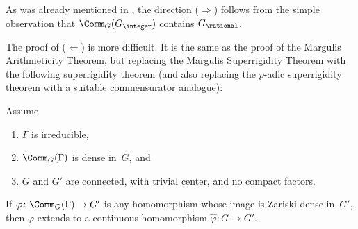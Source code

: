 As was already mentioned in , the direction ($\Rightarrow$) follows from the simple observation that $\Comm_G(G_\integer)$ contains $G_\rational$. 

The proof of ($\Leftarrow$) is more difficult. It is the same as the proof of the Margulis Arithmeticity Theorem, but replacing the Margulis Superrigidity Theorem  with the following superrigidity theorem (and also replacing the $p$-adic superrigidity theorem with a suitable commensurator analogue):

\begin{thm} \label{CommSuper}
Assume
\noprelistbreak
	\begin{enumerate} \renewcommand{\theenumi}{\roman{enumi}}
	\item $\Gamma$ is irreducible, 
	\item $\Comm_G(\Gamma)$ is dense in~$G$,
 	and
	\item  $G$ and $G'$ are connected, with trivial center, and no compact factors.
	\end{enumerate}
If $\varphi \colon \Comm_G(\Gamma) \to G'$ is any homomorphism whose image is Zariski dense in~$G'$, then $\varphi$ extends to a continuous homomorphism $\widehat\varphi \colon G \to G'$.
\end{thm}

